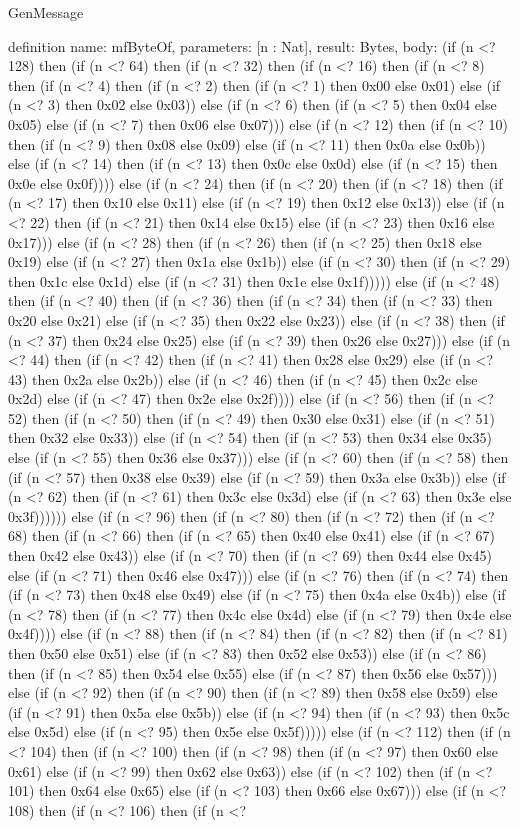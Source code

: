 \begin{lexlean}{GenMessage}
\begin{semanticmodule}
definition{
  name: mfByteOf,
  parameters: [n : Nat],
  result: Bytes,
  body: (if (n <? 128) then (if (n <? 64) then (if (n <? 32) then (if (n <? 16) then (if (n <? 8) then (if (n <? 4) then (if (n <? 2) then (if (n <? 1) then 0x00 else 0x01) else (if (n <? 3) then 0x02 else 0x03)) else (if (n <? 6) then (if (n <? 5) then 0x04 else 0x05) else (if (n <? 7) then 0x06 else 0x07))) else (if (n <? 12) then (if (n <? 10) then (if (n <? 9) then 0x08 else 0x09) else (if (n <? 11) then 0x0a else 0x0b)) else (if (n <? 14) then (if (n <? 13) then 0x0c else 0x0d) else (if (n <? 15) then 0x0e else 0x0f)))) else (if (n <? 24) then (if (n <? 20) then (if (n <? 18) then (if (n <? 17) then 0x10 else 0x11) else (if (n <? 19) then 0x12 else 0x13)) else (if (n <? 22) then (if (n <? 21) then 0x14 else 0x15) else (if (n <? 23) then 0x16 else 0x17))) else (if (n <? 28) then (if (n <? 26) then (if (n <? 25) then 0x18 else 0x19) else (if (n <? 27) then 0x1a else 0x1b)) else (if (n <? 30) then (if (n <? 29) then 0x1c else 0x1d) else (if (n <? 31) then 0x1e else 0x1f))))) else (if (n <? 48) then (if (n <? 40) then (if (n <? 36) then (if (n <? 34) then (if (n <? 33) then 0x20 else 0x21) else (if (n <? 35) then 0x22 else 0x23)) else (if (n <? 38) then (if (n <? 37) then 0x24 else 0x25) else (if (n <? 39) then 0x26 else 0x27))) else (if (n <? 44) then (if (n <? 42) then (if (n <? 41) then 0x28 else 0x29) else (if (n <? 43) then 0x2a else 0x2b)) else (if (n <? 46) then (if (n <? 45) then 0x2c else 0x2d) else (if (n <? 47) then 0x2e else 0x2f)))) else (if (n <? 56) then (if (n <? 52) then (if (n <? 50) then (if (n <? 49) then 0x30 else 0x31) else (if (n <? 51) then 0x32 else 0x33)) else (if (n <? 54) then (if (n <? 53) then 0x34 else 0x35) else (if (n <? 55) then 0x36 else 0x37))) else (if (n <? 60) then (if (n <? 58) then (if (n <? 57) then 0x38 else 0x39) else (if (n <? 59) then 0x3a else 0x3b)) else (if (n <? 62) then (if (n <? 61) then 0x3c else 0x3d) else (if (n <? 63) then 0x3e else 0x3f)))))) else (if (n <? 96) then (if (n <? 80) then (if (n <? 72) then (if (n <? 68) then (if (n <? 66) then (if (n <? 65) then 0x40 else 0x41) else (if (n <? 67) then 0x42 else 0x43)) else (if (n <? 70) then (if (n <? 69) then 0x44 else 0x45) else (if (n <? 71) then 0x46 else 0x47))) else (if (n <? 76) then (if (n <? 74) then (if (n <? 73) then 0x48 else 0x49) else (if (n <? 75) then 0x4a else 0x4b)) else (if (n <? 78) then (if (n <? 77) then 0x4c else 0x4d) else (if (n <? 79) then 0x4e else 0x4f)))) else (if (n <? 88) then (if (n <? 84) then (if (n <? 82) then (if (n <? 81) then 0x50 else 0x51) else (if (n <? 83) then 0x52 else 0x53)) else (if (n <? 86) then (if (n <? 85) then 0x54 else 0x55) else (if (n <? 87) then 0x56 else 0x57))) else (if (n <? 92) then (if (n <? 90) then (if (n <? 89) then 0x58 else 0x59) else (if (n <? 91) then 0x5a else 0x5b)) else (if (n <? 94) then (if (n <? 93) then 0x5c else 0x5d) else (if (n <? 95) then 0x5e else 0x5f))))) else (if (n <? 112) then (if (n <? 104) then (if (n <? 100) then (if (n <? 98) then (if (n <? 97) then 0x60 else 0x61) else (if (n <? 99) then 0x62 else 0x63)) else (if (n <? 102) then (if (n <? 101) then 0x64 else 0x65) else (if (n <? 103) then 0x66 else 0x67))) else (if (n <? 108) then (if (n <? 106) then (if (n <? }
\end{semanticmodule}
\end{lexlean}

